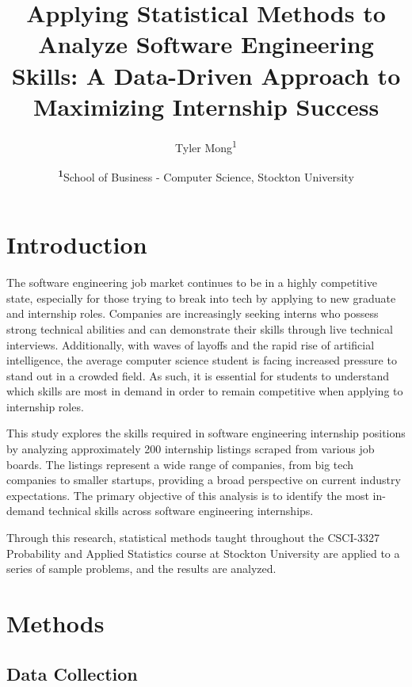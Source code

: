 \documentclass[
	a4paper, %
	10pt, %
	unnumberedsections, %
	twoside, %
]{LTJournalArticle}
\title{Applying Statistical Methods to Analyze Software Engineering Skills: A Data-Driven Approach to Maximizing Internship Success} %
\author{%
	Tyler Mong\textsuperscript{1}
}
\date{\footnotesize\textsuperscript{\textbf{1}}School of Business - Computer Science, Stockton University}
\begin{document}
\maketitle %


\section{Introduction}

The software engineering job market continues to be in a highly competitive state, especially for those trying to break into tech by applying to new graduate and internship roles. Companies are increasingly seeking interns who possess strong technical abilities and can demonstrate their skills through live technical interviews. Additionally, with waves of layoffs and the rapid rise of artificial intelligence, the average computer science student is facing increased pressure to stand out in a crowded field. As such, it is essential for students to understand which skills are most in demand in order to remain competitive when applying to internship roles.

This study explores the skills required in software engineering internship positions by analyzing approximately 200 internship listings scraped from various job boards. The listings represent a wide range of companies, from big tech companies to smaller startups, providing a broad perspective on current industry expectations. The primary objective of this analysis is to identify the most in-demand technical skills across software engineering internships.

Through this research, statistical methods taught throughout the CSCI-3327 Probability and Applied Statistics course at Stockton University are applied to a series of sample problems, and the results are analyzed. 


\section{Methods}

\subsection{Data Collection}
\end{document}
